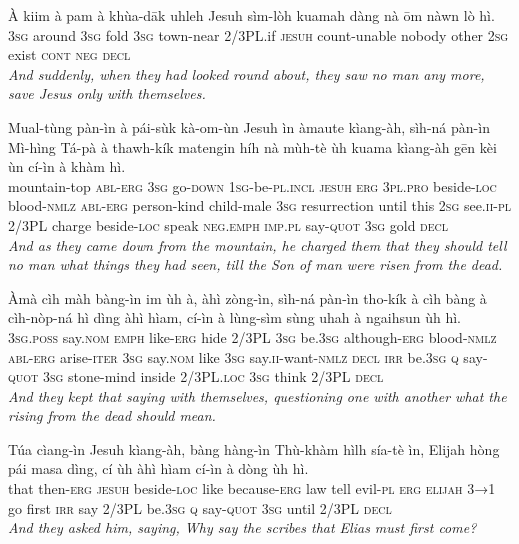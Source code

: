 \documentclass[11pt,a4paper]{article}
\begin{document}
\begin{exe}
\gll À kiim à pam à khùa-dāk uhleh Jesuh sìm-lòh kuamah dàng nà ōm nàwn lò hì. \\
     \textsc{3sg} around \textsc{3sg} fold \textsc{3sg} town-near 2/3PL.if \textsc{jesuh} count-unable nobody other \textsc{2sg} exist \textsc{cont} \textsc{neg} \textsc{decl} \\
\glt \textcolor{kjvcolor}{\textit{And suddenly, when they had looked round about, they saw no man any more, save Jesus only with themselves.}}

\gll Mual-tùng pàn-ìn à pái-sùk kà-om-ùn Jesuh ìn àmaute kìang-àh, sìh-ná pàn-ìn Mì-hìng Tá-pà à thawh-kík matengin híh nà mùh-tè ùh kuama kìang-àh gēn kèi ùn cí-ìn à khàm hì. \\
     mountain-top \textsc{abl}-\textsc{erg} \textsc{3sg} go-\textsc{down} \textsc{1sg}-be-\textsc{pl}.\textsc{incl} \textsc{jesuh} \textsc{erg} \textsc{3pl}.\textsc{pro} beside-\textsc{loc} blood-\textsc{nmlz} \textsc{abl}-\textsc{erg} person-kind child-male \textsc{3sg} resurrection until this \textsc{2sg} see.\textsc{ii}-\textsc{pl} 2/3PL charge beside-\textsc{loc} speak \textsc{neg}.\textsc{emph} \textsc{imp}.\textsc{pl} say-\textsc{quot} \textsc{3sg} gold \textsc{decl} \\
\glt \textcolor{kjvcolor}{\textit{And as they came down from the mountain, he charged them that they should tell no man what things they had seen, till the Son of man were risen from the dead.}}

\gll Àmà cìh màh bàng-ìn im ùh à, àhì zòng-ìn, sìh-ná pàn-ìn tho-kík à cìh bàng à cìh-nòp-ná hì dìng àhì hìam, cí-ìn à lùng-sìm sùng uhah à ngaihsun ùh hì. \\
     \textsc{3sg}.\textsc{poss} say.\textsc{nom} \textsc{emph} like-\textsc{erg} hide 2/3PL \textsc{3sg} be.\textsc{3sg} although-\textsc{erg} blood-\textsc{nmlz} \textsc{abl}-\textsc{erg} arise-\textsc{iter} \textsc{3sg} say.\textsc{nom} like \textsc{3sg} say.\textsc{ii}-want-\textsc{nmlz} \textsc{decl} \textsc{irr} be.\textsc{3sg} \textsc{q} say-\textsc{quot} \textsc{3sg} stone-mind inside 2/3PL.\textsc{loc} \textsc{3sg} think 2/3PL \textsc{decl} \\
\glt \textcolor{kjvcolor}{\textit{And they kept that saying with themselves, questioning one with another what the rising from the dead should mean.}}

\gll Túa cìang-ìn Jesuh kìang-àh, bàng hàng-ìn Thù-khàm hìlh sía-tè ìn, Elijah hòng pái masa dìng, cí ùh àhì hìam cí-ìn à dòng ùh hì. \\
     that then-\textsc{erg} \textsc{jesuh} beside-\textsc{loc} like because-\textsc{erg} law tell evil-\textsc{pl} \textsc{erg} \textsc{elijah} \textsc{3→1} go first \textsc{irr} say 2/3PL be.\textsc{3sg} \textsc{q} say-\textsc{quot} \textsc{3sg} until 2/3PL \textsc{decl} \\
\glt \textcolor{kjvcolor}{\textit{And they asked him, saying, Why say the scribes that Elias must first come?}}


\end{exe}
\end{document}
